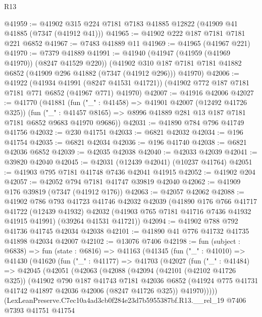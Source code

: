 \begin{lexlean}{R13}
\begin{coremodule}
@41959 := @41902 @315 @224 @7181 @7183 @41885 @12822 (@41909 @41 @41885 (@7347 (@41912 @41)))
@41965 := @41902 @222 @187 @7181 @7181 @221 @6852
@41967 := @7483 @41889 @11
@41969 := @41965 (@41967 @221)
@41970 := @7379 @41889
@41991 := @41940
    (@41947 (@41959 (@41969 @41970)) (@8247 @41529 @220))
    (@41902 @310 @187 @7181 @7181 @41882 @6852 (@41909 @296 @41882 (@7347 (@41912 @296))) @41970)
@42006 := @41922
    (@41934 @41991 (@8247 @41531 @41721))
    (@41902 @772 @187 @7181 @7181 @771 @6852 (@41967 @771) @41970)
@42007 := @41916 @42006
@42027 := @41770
    (@41881
      (fun ("_" : @41458) => @41901 @42007 (@12492 @41726 @325))
      (fun ("_" : @41457 @8165) => @8996 @41889 @281 @13 @187 @7181 @7181 @6852 @9683 @41970 @9686))
@42031 := @41890 @784 @796 @41749 @41756
@42032 := @230 @41751
@42033 := @6821 @42032
@42034 := @196 @41754
@42035 := @6821 @42034
@42036 := @196 @41740
@42038 := @6821 @42036 @6852
@42039 := @42035 @42038
@42040 := @42033 @42039
@42041 := @39820 @42040
@42045 := @42031 (@12439 @42041) (@10237 @41764)
@42051 := @41903 @795 @7181 @41748 @7436 @42041 @41915
@42052 := @41902 @204
@42057 := @42052 @794 @7181 @41747 @39819 @42040
@42062 := @41909 @176 @39819 (@7347 (@41912 @176))
@42063 := @42057 @42062
@42088 := @41902
    @786
    @793
    @41723
    @41746
    @42032
    @42039
    (@41890
      @176
      @766
      @41717
      @41722
      (@12439 @41932)
      @42032
      (@41903 @765 @7181 @41716 @7436 @41932 @41915 @41991)
      (@39264 @41531 @41721))
@42094 := @41902 @788 @792 @41736 @41745 @42034 @42038
@42101 := @41890 @41 @776 @41732 @41735 @41898 @42034 @42007
@42102 := @13076 @7406
@42198 := fun (subject : @6838) =>
  fun (state : @6816) =>
  @41163
    (@41345
      (fun ("_" : @41010) =>
      @41430
        (@41620
          (fun ("_" : @41177) =>
          @41703
            (@42027
              (fun ("_" : @41484) =>
              @42045
                (@42051
                  (@42063
                    (@42088
                      (@42094
                        (@42101 (@42102 @41726 @325))
                        (@41902
                          @790
                          @187
                          @41743
                          @7181
                          @42036
                          @6852
                          (@41924 @775 @41731 @41742 @41897 @42036 @42006 (@8247 @41726 @325))
                          @41970)))))
                (LexLeanPreserve.C7ec10a4ad3cb0f284e23d7b5955387bf.R13.__rel_19
                  @7406
                  @7393
                  @41751
                  @41754

\end{coremodule}
\end{lexlean}
